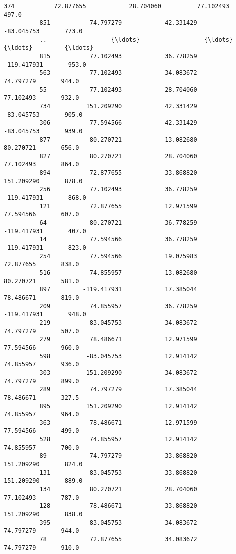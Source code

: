 \documentclass[11pt]{article}
\begin{document}
\begin{Verbatim}[commandchars=\\\{\}]
          374           72.877655            28.704060          77.102493       497.0   
          851           74.797279            42.331429         -83.045753       773.0   
          ..                  {\ldots}                  {\ldots}                {\ldots}         {\ldots}   
          815           77.102493            36.778259        -119.417931       953.0   
          563           77.102493            34.083672          74.797279       944.0   
          55            77.102493            28.704060          77.102493       932.0   
          734          151.209290            42.331429         -83.045753       905.0   
          306           77.594566            42.331429         -83.045753       939.0   
          877           80.270721            13.082680          80.270721       656.0   
          827           80.270721            28.704060          77.102493       864.0   
          894           72.877655           -33.868820         151.209290       878.0   
          256           77.102493            36.778259        -119.417931       868.0   
          121           72.877655            12.971599          77.594566       607.0   
          64            80.270721            36.778259        -119.417931       407.0   
          14            77.594566            36.778259        -119.417931       823.0   
          254           77.594566            19.075983          72.877655       838.0   
          516           74.855957            13.082680          80.270721       581.0   
          897         -119.417931            17.385044          78.486671       819.0   
          209           74.855957            36.778259        -119.417931       948.0   
          219          -83.045753            34.083672          74.797279       507.0   
          279           78.486671            12.971599          77.594566       960.0   
          598          -83.045753            12.914142          74.855957       936.0   
          303          151.209290            34.083672          74.797279       899.0   
          289           74.797279            17.385044          78.486671       327.5   
          895          151.209290            12.914142          74.855957       964.0   
          363           78.486671            12.971599          77.594566       499.0   
          528           74.855957            12.914142          74.855957       700.0   
          89            74.797279           -33.868820         151.209290       824.0   
          131          -83.045753           -33.868820         151.209290       889.0   
          134           80.270721            28.704060          77.102493       787.0   
          128           78.486671           -33.868820         151.209290       838.0   
          395          -83.045753            34.083672          74.797279       944.0   
          78            72.877655            34.083672          74.797279       910.0   
          

\end{Verbatim}
\end{document}
